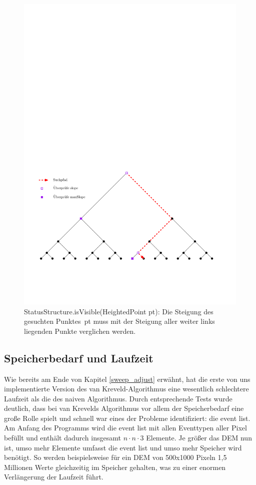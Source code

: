 \begin{figure}[ht]
    \centering
    \includegraphics[width=.7\textwidth]{bilder/StatusStructure_isVisible}
    \caption[StatusStructure.isVisible(HeightedPoint pt)]{StatusStructure.isVisible(HeightedPoint pt): Die Steigung des gesuchten Punktes~pt muss mit der Steigung aller weiter links liegenden Punkte verglichen werden.}
    \label{fig:isVisible}
\end{figure}

\subsection{Speicherbedarf und Laufzeit}
\label{speicher}

Wie bereits am Ende von Kapitel \ref{sweep_adjust} erwähnt, hat die erste von uns implementierte Version des van Kreveld-Algorithmus eine 
wesentlich schlechtere Laufzeit als die des naiven Algorithmus. Durch entsprechende Tests wurde deutlich, dass bei van Krevelds Algorithmus vor allem
der Speicherbedarf eine große Rolle spielt und schnell war eines der Probleme identifiziert: die event list. Am Anfang des Programms wird die event list 
mit allen Eventtypen aller Pixel befüllt und enthält dadurch insgesamt $n \cdot n \cdot 3$ Elemente. Je größer das DEM nun ist, umso mehr Elemente 
umfasst die event list und umso mehr Speicher wird benötigt. So werden beispielsweise für ein DEM von 500x1000 Pixeln 1,5 Millionen Werte 
gleichzeitig im Speicher gehalten, was zu einer enormen Verlängerung der Laufzeit führt. 

